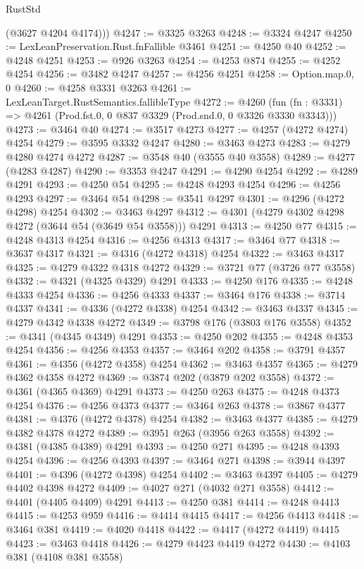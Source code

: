 \begin{lexlean}{RustStd}
\begin{coremodule}
        (@3627 @4204 @4174)))
@4247 := @3325 @3263
@4248 := @3324 @4247
@4250 := LexLeanPreservation.Rust.fnFallible @3461
@4251 := @4250 @40
@4252 := @4248 @4251
@4253 := @926 @3263
@4254 := @4253 @874
@4255 := @4252 @4254
@4256 := @3482 @4247
@4257 := @4256 @4251
@4258 := Option.map.{0, 0}
@4260 := @4258 @3331 @3263
@4261 := LexLeanTarget.RustSemantics.fallibleType
@4272 := @4260
    (fun (fn : @3331) => @4261 (Prod.fst.{0, 0} @837 @3329 (Prod.snd.{0, 0} @3326 @3330 @3343)))
@4273 := @3464 @40
@4274 := @3517 @4273
@4277 := @4257 (@4272 @4274) @4254
@4279 := @3595 @3332 @4247
@4280 := @3463 @4273
@4283 := @4279 @4280 @4274 @4272
@4287 := @3548 @40 (@3555 @40 @3558)
@4289 := @4277 (@4283 @4287)
@4290 := @3353 @4247
@4291 := @4290 @4254
@4292 := @4289 @4291
@4293 := @4250 @54
@4295 := @4248 @4293 @4254
@4296 := @4256 @4293
@4297 := @3464 @54
@4298 := @3541 @4297
@4301 := @4296 (@4272 @4298) @4254
@4302 := @3463 @4297
@4312 := @4301 (@4279 @4302 @4298 @4272 (@3644 @54 (@3649 @54 @3558))) @4291
@4313 := @4250 @77
@4315 := @4248 @4313 @4254
@4316 := @4256 @4313
@4317 := @3464 @77
@4318 := @3637 @4317
@4321 := @4316 (@4272 @4318) @4254
@4322 := @3463 @4317
@4325 := @4279 @4322 @4318 @4272
@4329 := @3721 @77 (@3726 @77 @3558)
@4332 := @4321 (@4325 @4329) @4291
@4333 := @4250 @176
@4335 := @4248 @4333 @4254
@4336 := @4256 @4333
@4337 := @3464 @176
@4338 := @3714 @4337
@4341 := @4336 (@4272 @4338) @4254
@4342 := @3463 @4337
@4345 := @4279 @4342 @4338 @4272
@4349 := @3798 @176 (@3803 @176 @3558)
@4352 := @4341 (@4345 @4349) @4291
@4353 := @4250 @202
@4355 := @4248 @4353 @4254
@4356 := @4256 @4353
@4357 := @3464 @202
@4358 := @3791 @4357
@4361 := @4356 (@4272 @4358) @4254
@4362 := @3463 @4357
@4365 := @4279 @4362 @4358 @4272
@4369 := @3874 @202 (@3879 @202 @3558)
@4372 := @4361 (@4365 @4369) @4291
@4373 := @4250 @263
@4375 := @4248 @4373 @4254
@4376 := @4256 @4373
@4377 := @3464 @263
@4378 := @3867 @4377
@4381 := @4376 (@4272 @4378) @4254
@4382 := @3463 @4377
@4385 := @4279 @4382 @4378 @4272
@4389 := @3951 @263 (@3956 @263 @3558)
@4392 := @4381 (@4385 @4389) @4291
@4393 := @4250 @271
@4395 := @4248 @4393 @4254
@4396 := @4256 @4393
@4397 := @3464 @271
@4398 := @3944 @4397
@4401 := @4396 (@4272 @4398) @4254
@4402 := @3463 @4397
@4405 := @4279 @4402 @4398 @4272
@4409 := @4027 @271 (@4032 @271 @3558)
@4412 := @4401 (@4405 @4409) @4291
@4413 := @4250 @381
@4414 := @4248 @4413
@4415 := @4253 @959
@4416 := @4414 @4415
@4417 := @4256 @4413
@4418 := @3464 @381
@4419 := @4020 @4418
@4422 := @4417 (@4272 @4419) @4415
@4423 := @3463 @4418
@4426 := @4279 @4423 @4419 @4272
@4430 := @4103 @381 (@4108 @381 @3558)

\end{coremodule}
\end{lexlean}
